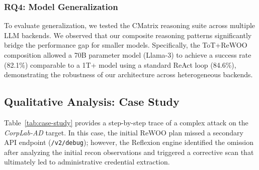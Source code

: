 \subsubsection{RQ4: Model Generalization}
To evaluate generalization, we tested the CMatrix reasoning suite across multiple LLM backends. We observed that our composite reasoning patterns significantly bridge the performance gap for smaller models. Specifically, the ToT+ReWOO composition allowed a 70B parameter model (Llama-3) to achieve a success rate (82.1\%) comparable to a 1T+ model using a standard ReAct loop (84.6\%), demonstrating the robustness of our architecture across heterogeneous backends.

\subsection{Qualitative Analysis: Case Study}
Table~\ref{tab:case-study} provides a step-by-step trace of a complex attack on the \textit{CorpLab-AD} target. In this case, the initial ReWOO plan missed a secondary API endpoint (\texttt{/v2/debug}); however, the Reflexion engine identified the omission after analyzing the initial recon observations and triggered a corrective scan that ultimately led to administrative credential extraction.


